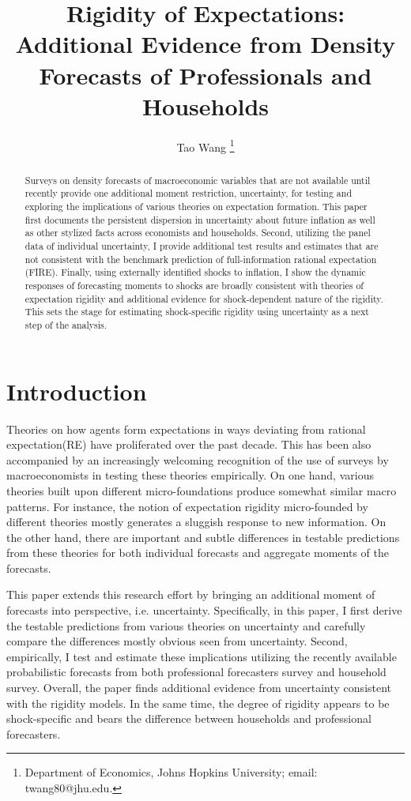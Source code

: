 \documentclass[12pt]{article}
\title{Rigidity of Expectations: Additional Evidence from Density Forecasts of Professionals and Households}
\author{Tao Wang \footnote{Department of Economics, Johns Hopkins University; email: twang80@jhu.edu.}}
\begin{document}
	
	\maketitle
	
	\begin{abstract}
		Surveys on density forecasts of macroeconomic variables that are not available until recently provide one additional moment restriction, uncertainty, for testing and exploring the implications of various theories on expectation formation. This paper first documents the persistent dispersion in uncertainty about future inflation as well as other stylized facts across economists and households.  Second,  utilizing the panel data of individual uncertainty, I provide additional test results and estimates that are not consistent with the benchmark prediction of full-information rational expectation (FIRE). Finally, using externally identified shocks to inflation, I show the dynamic responses of forecasting moments to shocks are broadly consistent with theories of expectation rigidity and additional evidence for shock-dependent nature of the rigidity.  This sets the stage for estimating shock-specific rigidity using uncertainty as a next step of the analysis.  
		
	\end{abstract}
	
	\newpage 
	
	\section{Introduction}
	
	
	Theories on how agents form expectations in ways deviating from rational expectation(RE) have proliferated over the past decade. This has been also accompanied by an increasingly welcoming recognition of the use of surveys by macroeconomists in testing these theories empirically.  On one hand, various theories built upon different micro-foundations produce somewhat similar macro patterns. For instance, the notion of expectation rigidity micro-founded by different theories mostly generates a sluggish response to new information.  On the other hand, there are important and subtle differences in testable predictions from these theories for both individual forecasts and aggregate moments of the forecasts. 
	
	This paper extends this research effort by bringing an additional moment of forecasts into perspective, i.e. uncertainty. Specifically, in this paper, I first derive the testable predictions from various theories on uncertainty and carefully compare the differences mostly obvious seen from uncertainty. Second, empirically, I test and estimate these implications utilizing the recently available probabilistic forecasts from both professional forecasters survey and household survey. Overall, the paper finds additional evidence from uncertainty consistent with the rigidity models. In the same time, the degree of rigidity appears to be shock-specific and bears the difference between households and professional forecasters. 
	
\end{document}
